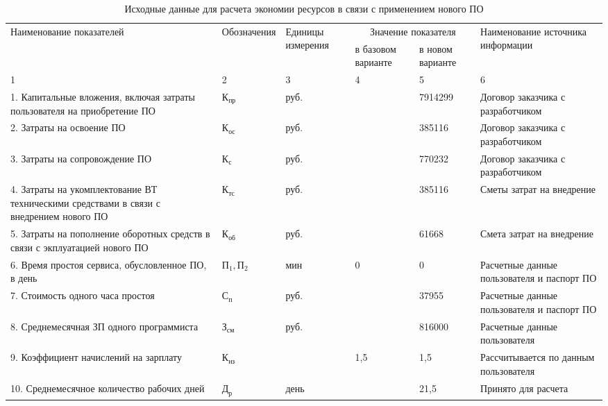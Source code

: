 \noindent
\begin{table}[ht]\footnotesize
  \caption{Исходные данные для расчета экономии ресурсов в связи с применением нового ПО}
  \label{source-data}
  \begin{tabularx}{\textwidth}{| X | p{1.1cm} | p{1.1cm} | p{1.3cm} | p{1.3cm} | p{3cm} |}
    \hline
    \multirow{2}{*}{Наименование показателей} & \multirow{2}{*}{Обозначения} & \multirow{2}{*}{Единицы измерения} & \multicolumn{2}{c|}{Значение показателя} & \multirow{2}{*}{Наименование источника информации}\\
    \cline{4-5}
    & & & в базовом варианте & в новом варианте & \\
    \hline
    1 & 2 & 3 & 4 & 5 & 6\\
    \hline
    1. Капитальные вложения, включая затраты пользователя на приобретение ПО & $\text{К}_\text{пр}$ & руб. & & 7914299 & Договор заказчика с разработчиком\\
    \hline
    2. Затраты на освоение ПО & $\text{К}_\text{ос}$ & руб. & & 385116 & Договор заказчика с разработчиком\\
    \hline
    3. Затраты на сопровождение ПО & $\text{К}_\text{с}$ & руб. & & 770232 & Договор заказчика с разработчиком\\
    \hline
    4. Затраты на укомплектование ВТ техническими средствами в связи с внедрением нового ПО & $\text{К}_\text{тс}$ & руб. & & 385116 & Сметы затрат на внедрение\\
    \hline
    5. Затраты на пополнение оборотных средств в связи с экплуатацией нового ПО & $\text{К}_\text{об}$ & руб. & & 61668 & Смета затрат на внедрение\\
    \hline
    6. Время простоя сервиса, обусловленное ПО, в день & $\text{П}_\text{1}, \text{П}_\text{2}$ & мин & 0 & 0 & Расчетные данные пользователя и паспорт ПО\\
    \hline
    7. Стоимость одного часа простоя & $\text{С}_\text{п}$ & руб. & & 37955 & Расчетные данные пользователя и паспорт ПО\\
    \hline
    8. Среднемесячная ЗП одного программиста & $\text{З}_\text{см}$ & руб. & & 816000 & Расчетные данные пользователя\\
    \hline
    9. Коэффициент начислений на зарплату & $\text{К}_\text{нз}$ & & 1,5 & 1,5 & Рассчитывается по данным пользователя\\
    \hline
    10. Среднемесячное количество рабочих дней & $\text{Д}_\text{р}$ & день & & 21,5 & Принято для расчета\\

\end{tabularx}
\end{table}
